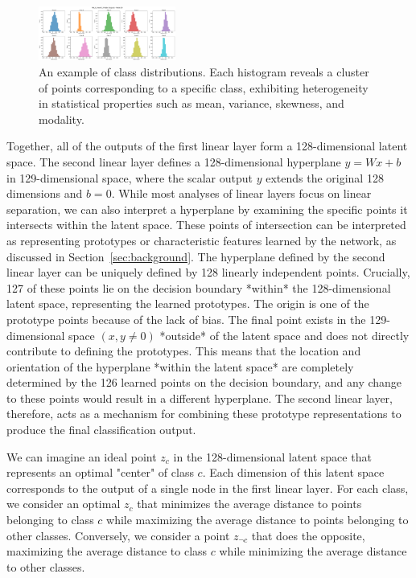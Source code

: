 \begin{figure}[H]
    \centering
    \includegraphics[width=0.4\textwidth]{images/distance_distribution}
    \caption{An example of class distributions. Each histogram reveals a cluster of points corresponding to a specific class, exhibiting heterogeneity in statistical properties such as mean, variance, skewness, and modality.}
    \label{fig:distance_distribution}
\end{figure}

Together, all of the outputs of the first linear layer form a 128-dimensional latent space. The second linear layer defines a 128-dimensional hyperplane $y=Wx+b$ in 129-dimensional space, where the scalar output $y$ extends the original 128 dimensions and $b=0$. While most analyses of linear layers focus on linear separation, we can also interpret a hyperplane by examining the specific points it intersects within the latent space. These points of intersection can be interpreted as representing prototypes or characteristic features learned by the network, as discussed in Section~\ref{sec:background}. The hyperplane defined by the second linear layer can be uniquely defined by 128 linearly independent points. Crucially, 127 of these points lie on the decision boundary *within* the 128-dimensional latent space, representing the learned prototypes. The origin is one of the prototype points because of the lack of bias. The final point exists in the 129-dimensional space $(x,y \neq 0)$ *outside* of the latent space and does not directly contribute to defining the prototypes. This means that the location and orientation of the hyperplane *within the latent space* are completely determined by the 126 learned points on the decision boundary, and any change to these points would result in a different hyperplane. The second linear layer, therefore, acts as a mechanism for combining these prototype representations to produce the final classification output.

We can imagine an ideal point $z_c$ in the 128-dimensional latent space that represents an optimal "center" of class $c$. Each dimension of this latent space corresponds to the output of a single node in the first linear layer. For each class, we consider an optimal $z_c$ that minimizes the average distance to points belonging to class $c$ while maximizing the average distance to points belonging to other classes. Conversely, we consider a point $z_{\neg c}$ that does the opposite, maximizing the average distance to class $c$ while minimizing the average distance to other classes.

